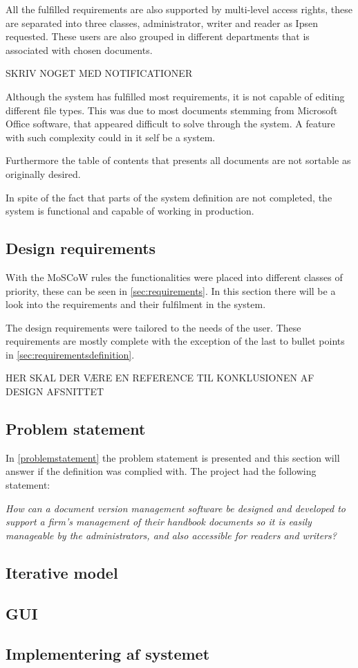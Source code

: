 All the fulfilled requirements are also supported by multi-level access rights, these are separated into three classes, administrator, writer and reader as Ipsen requested. These users are also grouped in different departments that is associated with chosen documents. 

SKRIV NOGET MED NOTIFICATIONER

Although the system has fulfilled most requirements, it is not capable of editing different file types. This was due to most documents stemming from Microsoft Office software, that appeared difficult to solve through the system. A feature with such complexity could in it self be a system.

Furthermore the table of contents that presents all documents are not sortable as originally desired.

In spite of the fact that parts of the system definition are not completed, the system is functional and capable of working in production.

\subsection{Design requirements}
With the MoSCoW rules the functionalities were placed into different classes of priority, these can be seen in \cref{sec:requirements}. In this section there will be a look into the requirements and their fulfilment in the system.

The design requirements were tailored to the needs of the user. These requirements are mostly complete with the exception of the last to bullet points in \cref{sec:requirementsdefinition}. 

HER SKAL DER VÆRE EN REFERENCE TIL KONKLUSIONEN AF DESIGN AFSNITTET

\subsection{Problem statement}
In \cref{problemstatement} the problem statement is presented and this section will answer if the definition was complied with. The project had the following statement:

\begin{center}
\textit{How can a document version management software be designed and developed to support a firm's management of their handbook documents so it is easily manageable by the administrators, and also accessible for readers and writers?}
\end{center}



\subsection{Iterative model}

\subsection{GUI}



\subsection{Implementering af systemet}